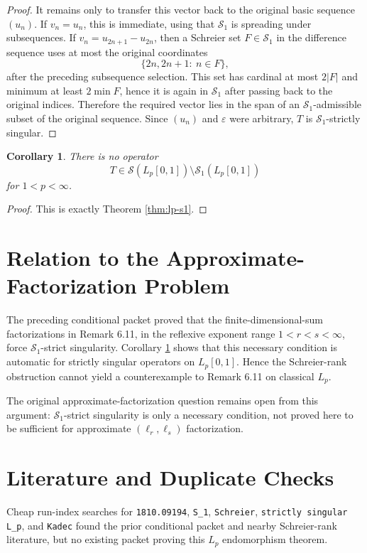 \documentclass[11pt]{article}
\newtheorem{corollary}{Corollary}
\newcommand{\SSing}{\mathcal S}
\newcommand{\Sone}{\mathcal S_1}
\begin{document}
\begin{proof}
It remains only to transfer this vector back to the original basic sequence
$(u_n)$.  If $v_n=u_n$, this is immediate, using that $\Sone$ is spreading
under subsequences.  If $v_n=u_{2n+1}-u_{2n}$, then a Schreier set
$F\in\Sone$ in the difference sequence uses at most the original coordinates
\[
  \{2n,2n+1:\ n\in F\},
\]
after the preceding subsequence selection.  This set has cardinal at most
$2|F|$ and minimum at least $2\min F$, hence it is again in $\Sone$ after
passing back to the original indices.  Therefore the required vector lies in
the span of an $\Sone$-admissible subset of the original sequence.  Since
$(u_n)$ and $\varepsilon$ were arbitrary, $T$ is $\Sone$-strictly singular.
\end{proof}

\begin{corollary}\label{cor:no-dependency}
There is no operator
\[
  T\in\SSing(L_p[0,1])\setminus \Sone(L_p[0,1])
\]
for $1<p<\infty$.
\end{corollary}

\begin{proof}
This is exactly Theorem \ref{thm:lp-s1}.
\end{proof}

\section*{Relation to the Approximate-Factorization Problem}

The preceding conditional packet proved that the finite-dimensional-sum
factorizations in Remark 6.11, in the reflexive exponent range
$1<r<s<\infty$, force $\Sone$-strict singularity.  Corollary
\ref{cor:no-dependency} shows that this necessary condition is automatic for
strictly singular operators on $L_p[0,1]$.  Hence the Schreier-rank obstruction
cannot yield a counterexample to Remark 6.11 on classical $L_p$.

The original approximate-factorization question remains open from this
argument: $\Sone$-strict singularity is only a necessary condition, not proved
here to be sufficient for approximate $(\ell_r,\ell_s)$ factorization.

\section*{Literature and Duplicate Checks}

Cheap run-index searches for \texttt{1810.09194}, \texttt{S\_1},
\texttt{Schreier}, \texttt{strictly singular L\_p}, and \texttt{Kadec}
found the prior conditional packet and nearby Schreier-rank literature, but no
existing packet proving this $L_p$ endomorphism theorem.
\end{document}
